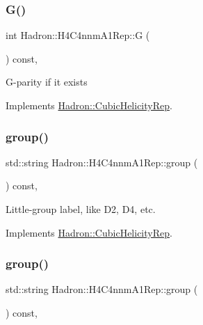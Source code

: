 \subsubsection{\texorpdfstring{G()}{G()}\hspace{0.1cm}{\footnotesize\ttfamily [3/3]}}
{\footnotesize\ttfamily int Hadron\+::\+H4\+C4nnm\+A1\+Rep\+::G (\begin{DoxyParamCaption}{ }\end{DoxyParamCaption}) const\hspace{0.3cm}{\ttfamily [inline]}, {\ttfamily [virtual]}}

G-\/parity if it exists 

Implements \mbox{\hyperlink{structHadron_1_1CubicHelicityRep_a50689f42be1e6170aa8cf6ad0597018b}{Hadron\+::\+Cubic\+Helicity\+Rep}}.

\mbox{\label{structHadron_1_1H4C4nnmA1Rep_a6434db04654db0e72689cb23155ce5c7}} 
\subsubsection{\texorpdfstring{group()}{group()}\hspace{0.1cm}{\footnotesize\ttfamily [1/5]}}
{\footnotesize\ttfamily std\+::string Hadron\+::\+H4\+C4nnm\+A1\+Rep\+::group (\begin{DoxyParamCaption}{ }\end{DoxyParamCaption}) const\hspace{0.3cm}{\ttfamily [inline]}, {\ttfamily [virtual]}}

Little-\/group label, like D2, D4, etc. 

Implements \mbox{\hyperlink{structHadron_1_1CubicHelicityRep_a101a7d76cd8ccdad0f272db44b766113}{Hadron\+::\+Cubic\+Helicity\+Rep}}.

\mbox{\label{structHadron_1_1H4C4nnmA1Rep_a6434db04654db0e72689cb23155ce5c7}} 
\subsubsection{\texorpdfstring{group()}{group()}\hspace{0.1cm}{\footnotesize\ttfamily [2/5]}}
{\footnotesize\ttfamily std\+::string Hadron\+::\+H4\+C4nnm\+A1\+Rep\+::group (\begin{DoxyParamCaption}{ }\end{DoxyParamCaption}) const\hspace{0.3cm}{\ttfamily [inline]}, {\ttfamily [virtual]}}

